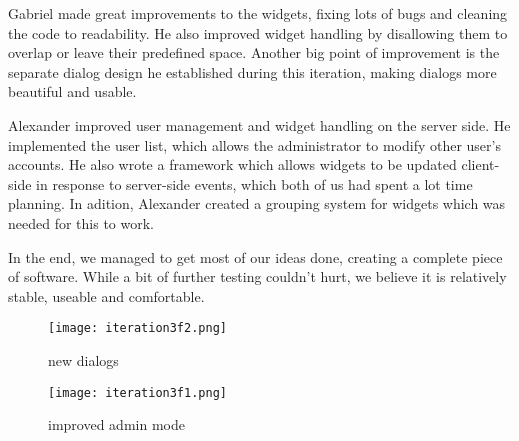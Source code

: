   Gabriel made great improvements to the widgets, fixing lots of bugs and cleaning the code to readability. He also improved widget handling by disallowing them to overlap or leave their predefined space. Another big point of improvement is the separate dialog design he established during this iteration, making dialogs more beautiful and usable.

  Alexander improved user management and widget handling on the server side. He implemented the user list, which allows the administrator to modify other user's accounts. He also wrote a framework which allows widgets to be updated client-side in response to server-side events, which both of us had spent a lot time planning. In adition, Alexander created a grouping system for widgets which was needed for this to work.

  In the end, we managed to get most of our ideas done, creating a complete piece of software. While a bit of further testing couldn't hurt, we believe it is relatively stable, useable and comfortable.

  \begin{figure}[h]
  \centering
  \texttt{[image: iteration3f2.png]}
  \caption{new dialogs}
  \label{fig:iterations3f1}
  \end{figure}

  \begin{figure}[h]
  \centering
  \texttt{[image: iteration3f1.png]}
  \caption{improved admin mode}
  \label{fig:iterations3f2}
  \end{figure}
